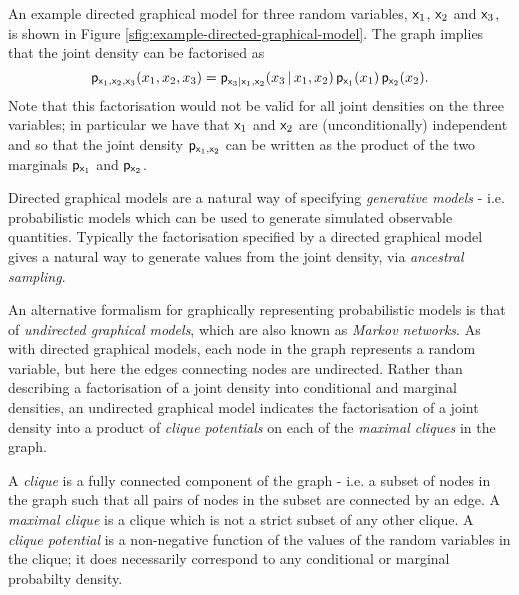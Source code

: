 An example directed graphical model for three random variables, $\mathsf{x}_1$, $\mathsf{x}_2$ and $\mathsf{x}_3$, is shown in Figure \ref{sfig:example-directed-graphical-model}. The graph implies that the joint density can be factorised as
\begin{equation}\label{eq:example-directed-graphical-model-factorisation}
  \mathsf{p}_{\mathsf{x}_1,\mathsf{x}_2,\mathsf{x}_3}(x_1,x_2,x_3) = 
  \mathsf{p}_{\mathsf{x}_3|\mathsf{x}_1,\mathsf{x}_2}(x_3 \operatorname{|} x_1,x_2) \,
  \mathsf{p}_{\mathsf{x}_1}(x_1) \, \mathsf{p}_{\mathsf{x}_2}(x_2).
\end{equation}
Note that this factorisation would not be valid for all joint densities on the three variables; in particular we have that $\mathsf{x}_1$ and $\mathsf{x}_2$ are (unconditionally) independent and so that the joint density $\mathsf{p}_{\mathsf{x}_1,\mathsf{x}_2}$ can be written as the product of the two marginals $\mathsf{p}_{\mathsf{x}_1}$ and $\mathsf{p}_{\mathsf{x}_2}$.

Directed graphical models are a natural way of specifying \emph{generative models} - i.e. probabilistic models which can be used to generate simulated observable quantities. Typically the factorisation specified by a directed graphical model gives a natural way to generate values from the joint density, via \emph{ancestral sampling}. 

An alternative formalism for graphically representing probabilistic models is that of \emph{undirected graphical models}\citep{}, which are also known as \emph{Markov networks}. As with directed graphical models, each node in the graph represents a random variable, but here the edges connecting nodes are undirected. Rather than describing a factorisation of a joint density into conditional and marginal densities, an undirected graphical model indicates the factorisation of a joint density into a product of \emph{clique potentials} on each of the \emph{maximal cliques} in the graph.

A \emph{clique} is a fully connected component of the graph - i.e. a subset of nodes in the graph such that all pairs of nodes in the subset are connected by an edge. A \emph{maximal clique} is a clique which is not a strict subset of any other clique. A \emph{clique potential} is a non-negative function of the values of the random variables in the clique; it does necessarily correspond to any conditional or marginal probabilty density. 

